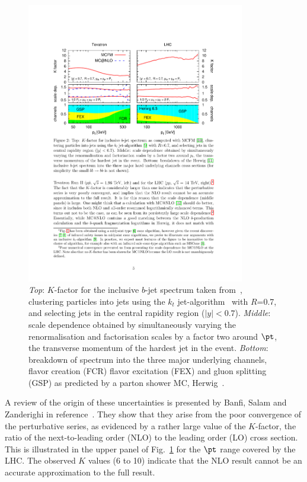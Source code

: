 \begin{figure}[tp]
\centering
\includegraphics[width=0.85\textwidth,viewport=300 410 530 690,clip]{FIGS/bjets_qcd.pdf}
  \caption{{\em Top}: $K$-factor for the inclusive $b$-jet spectrum taken from~\cite{Salam.AccurateHQ}, clustering particles into jets using the $k_t$   jet-algorithm~\cite{kt1}  with $R$=0.7, and selecting jets in the central rapidity region ($|y| <0.7$). {\em Middle}: scale dependence obtained by simultaneously varying the renormalisation and factorisation scales by a factor two around $\pt$, the transverse momentum of the hardest jet in the event. {\em Bottom}: breakdown of spectrum into the three major underlying channels, flavor creation (FCR) flavor excitation (FEX) and gluon splitting (GSP) as predicted by a parton shower MC, Herwig~\cite{Herwig}.}
  \label{fig:bjets_qcd}
\end{figure}
A review of the origin of these uncertainties is presented by Banfi, Salam and Zanderighi in reference~\cite{Salam.AccurateHQ}.  They show that they arise from the poor convergence of the perturbative series, as evidenced by a rather large value of the $K$-factor, the ratio of the next-to-leading order (NLO) to the leading order (LO) cross section. %
This is illustrated in the upper panel of Fig.~\ref{fig:bjets_qcd} for the $\pt$ range covered by the LHC.   The observed $K$ values (6 to 10) indicate that the NLO result cannot be an accurate approximation to the full result.

